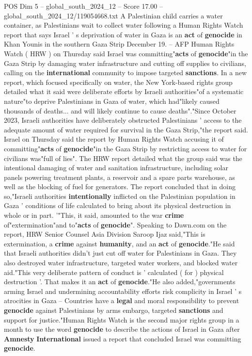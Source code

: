 \begin{textsample}{POS Dim 5 – global\_south\_2024\_12 – Score 17.00 – global\_south\_2024\_12/119054668.txt}  \label{ex:f5_pos_054}
A Palestinian child carries a water container, as Palestinians wait to collect water following a Human Rights Watch report that says Israel ' s deprivation of water in Gaza is an \textbf{act} of \textbf{genocide} in Khan Younis in the southern Gaza Strip December 19. -- AFP Human Rights Watch ( HRW ) on Thursday said Israel was committing"\textbf{acts} of \textbf{genocide}"in the Gaza Strip by damaging water infrastructure and cutting off supplies to civilians, calling on the \textbf{international} community to impose targeted \textbf{sanctions}.
In a new report, which focused specifically on water, the New York-based rights group detailed what it said were deliberate efforts by Israeli authorities"of a systematic nature"to deprive Palestinians in Gaza of water, which had"likely caused thousands of deaths... and will likely continue to cause deaths"."Since October 2023, Israeli authorities have deliberately obstructed Palestinians ' access to the adequate amount of water required for survival in the Gaza Strip,"the report said.
Israel on Thursday said the report by Human Rights Watch accusing it of committing"\textbf{acts} of \textbf{genocide}"in the Gaza Strip by restricting access to water for civilians was"full of lies".
The HRW report detailed what the group said was the intentional damaging of water and sanitation infrastructure, including solar panels powering treatment plants, a reservoir and a spare parts warehouse, as well as the blocking of fuel for generators.
The report concluded that in doing so,"Israeli authorities \textbf{intentionally} inflicted on the Palestinian population in Gaza ' conditions of life calculated to bring about its physical destruction in whole or in part. '"This, it said, amounted to the war \textbf{crime} of"extermination"and to"\textbf{acts} of \textbf{genocide}".
Speaking to Dawn.com on the report, HRW Senior Counsel Asia Division Saroop Ijaz said,"This is extermination, a \textbf{crime} against \textbf{humanity}, and an \textbf{act} of \textbf{genocide}."He said that Israeli authorities didn't just cut off water for Palestinians in Gaza.
They also destroyed water infrastructure, targeted water workers, and blocked water aid."This very deliberate pattern of conduct is ' calculated ( for ) physical destruction '.
That makes it an \textbf{act} of \textbf{genocide}."He also added,"governments arming Israel and undermining accountability efforts risk complicity in Israel ' s atrocities in Gaza -- Countries have a \textbf{legal} and moral responsibility to prevent \textbf{genocide} against Palestinians by arms embargo, targeted \textbf{sanctions} and support for justice."Human Rights Watch is the second major rights group in a month to use the word \textbf{genocide} to describe the actions of Israel in Gaza after \textbf{Amnesty} \textbf{International} issued a report that concluded Israel was committing \textbf{genocide}.

\end{textsample}
